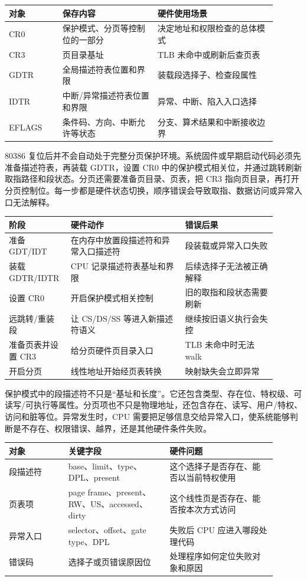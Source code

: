 \begin{longtable}{L{0.18\linewidth}L{0.32\linewidth}L{0.4\linewidth}}
\toprule
对象 & 保存内容 & 硬件使用场景 \\
\midrule
CR0 & 保护模式、分页等控制位的一部分 & 决定地址和权限检查的总体模式 \\
CR3 & 页目录基址 & TLB 未命中或刷新后查页表 \\
GDTR & 全局描述符表位置和界限 & 装载段选择子、检查段属性 \\
IDTR & 中断/异常描述符表位置和界限 & 异常、中断、陷入入口选择 \\
EFLAGS & 条件码、方向、中断允许等状态 & 分支、算术结果和中断接收边界 \\
\bottomrule
\end{longtable}

80386 复位后并不会自动处于完整分页保护环境。系统固件或早期启动代码必须先准备描述符表，再装载 GDTR，设置 CR0 中的保护模式相关位，并通过跳转刷新取指路径和段状态。分页还需要准备页目录、页表，把 CR3 指向页目录，再打开分页控制位。每一步都是硬件状态切换，顺序错误会导致取指、数据访问或异常入口无法解释。

\begin{longtable}{L{0.18\linewidth}L{0.4\linewidth}L{0.32\linewidth}}
\toprule
阶段 & 硬件动作 & 错误后果 \\
\midrule
准备 GDT/IDT & 在内存中放置段描述符和异常入口描述符 & 段装载或异常入口失败 \\
装载 GDTR/IDTR & CPU 记录描述符表基址和界限 & 后续选择子无法被正确解释 \\
设置 CR0 & 开启保护模式相关控制 & 旧的取指和段状态需要刷新 \\
远跳转/重装段 & 让 CS/DS/SS 等进入新描述符语义 & 继续按旧语义执行会失控 \\
准备页表并设置 CR3 & 给分页硬件页目录入口 & TLB 未命中时无法 walk \\
开启分页 & 线性地址开始经页表转换 & 映射缺失会立即异常 \\
\bottomrule
\end{longtable}

保护模式中的段描述符不只是“基址和长度”。它还包含类型、存在位、特权级、可读写/可执行等属性。分页项也不只是物理地址，还包含存在、读写、用户/特权、访问和脏等位。异常发生时，CPU 需要把足够信息交给异常入口，使系统能够判断是不存在、权限错误、越界，还是其他硬件条件失败。

\begin{longtable}{L{0.2\linewidth}L{0.34\linewidth}L{0.36\linewidth}}
\toprule
对象 & 关键字段 & 硬件问题 \\
\midrule
段描述符 & base、limit、type、DPL、present & 这个选择子是否存在、能否以当前特权使用 \\
页表项 & page frame、present、RW、US、accessed、dirty & 这个线性页是否存在、能否按本次方式访问 \\
异常入口 & selector、offset、gate type、DPL & 失败后 CPU 应进入哪段处理代码 \\
错误码 & 选择子或页错误原因位 & 处理程序如何定位失败对象和原因 \\
\bottomrule
\end{longtable}

